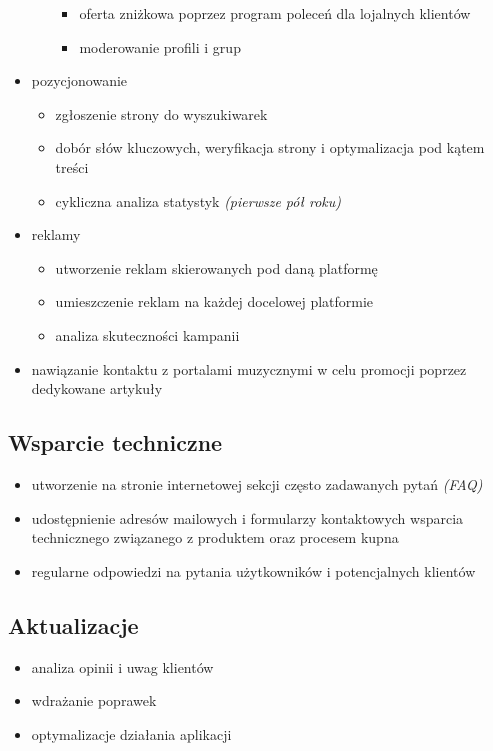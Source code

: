 \documentclass[12pt]{article}
\begin{document}
\begin{itemize}
\begin{itemize}
\begin{itemize}
            \item oferta zniżkowa poprzez program poleceń dla lojalnych klientów
            \item moderowanie profili i grup \end{itemize} \end{itemize}
    \item pozycjonowanie \begin{itemize}
        \item zgłoszenie strony do wyszukiwarek
        \item dobór słów kluczowych, weryfikacja strony i optymalizacja pod kątem treści
        \item cykliczna analiza statystyk \textit{(pierwsze pół roku)} \end{itemize}
    \item reklamy \begin{itemize}
        \item utworzenie reklam skierowanych pod daną platformę
        \item umieszczenie reklam na każdej docelowej platformie
        \item analiza skuteczności kampanii \end{itemize}
    \item nawiązanie kontaktu z portalami muzycznymi w celu promocji poprzez dedykowane artykuły
\end{itemize}

\subsection{Wsparcie techniczne}

\begin{itemize}
    \item utworzenie na stronie internetowej sekcji często zadawanych pytań \textit{(FAQ)}
    \item udostępnienie adresów mailowych i formularzy kontaktowych wsparcia technicznego związanego z produktem oraz procesem kupna
    \item regularne odpowiedzi na pytania użytkowników i potencjalnych klientów
\end{itemize}

\subsection{Aktualizacje}

\begin{itemize}
    \item analiza opinii i uwag klientów
    \item wdrażanie poprawek
    \item optymalizacje działania aplikacji
\end{itemize}
\end{document}
